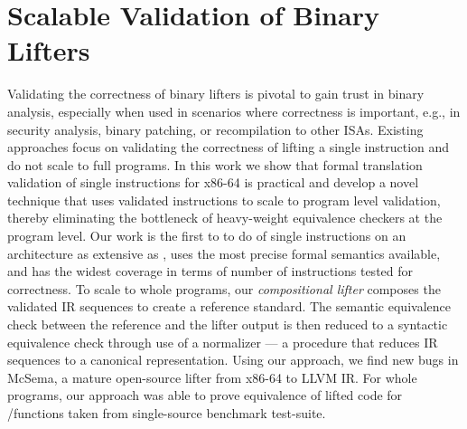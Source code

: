 \chapter{Scalable Validation of Binary Lifters}\label{chap:scalable-val}

Validating the correctness of binary lifters is pivotal to gain trust in
binary analysis, especially when used in scenarios where correctness is
important, e.g., in security analysis, binary patching, or recompilation
to other ISAs. Existing approaches focus on validating the correctness of
lifting a single instruction and do not scale to full programs. In this
work we show that formal translation validation of single instructions for
x86-64 is practical and develop a novel technique that uses validated
instructions to scale to program level validation, thereby eliminating the
bottleneck of heavy-weight equivalence checkers at the program level. Our
work is the first to to do \tv of single instructions on an architecture as 
extensive as \ISA,
uses the most precise formal semantics available, and has the widest
coverage in terms of number of instructions tested for correctness. 
%
To scale to whole programs, our \emph{compositional lifter} composes the validated IR
sequences to create a reference standard. The semantic equivalence check between the
reference and the lifter output is then reduced to a syntactic equivalence check through
use of a normalizer --- a procedure that reduces IR sequences to a
canonical representation.
%    
Using our approach, we find \sivFail new bugs in McSema, a mature open-source
lifter from x86-64 to LLVM IR. For whole programs, our approach was able to
prove equivalence of lifted code for \plvP/\plvT functions taken
from single-source benchmark test-suite.










